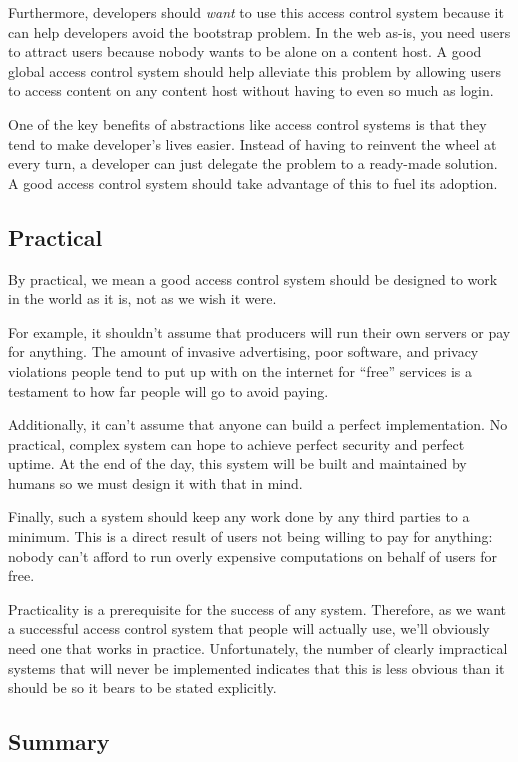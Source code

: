 \documentclass[pdftex,12pt,a4papaer,twoside,notitlepage]{report}
\begin{document}
Furthermore, developers should \emph{want} to use this access control system
because it can help developers avoid the bootstrap problem. In the web as-is,
you need users to attract users because nobody wants to be alone on a content
host. A good global access control system should help alleviate this problem by
allowing users to access content on any content host without having to even so
much as login.

One of the key benefits of abstractions like access control systems is that they
tend to make developer's lives easier. Instead of having to reinvent the wheel
at every turn, a developer can just delegate the problem to a ready-made
solution. A good access control system should take advantage of this to fuel its
adoption.

\subsection{Practical}

By practical, we mean a good access control system should be designed to work in
the world as it is, not as we wish it were.

For example, it shouldn't assume that producers will run their own servers or
pay for anything. The amount of invasive advertising, poor software, and privacy
violations people tend to put up with on the internet for ``free'' services is a
testament to how far people will go to avoid paying.

Additionally, it can't assume that anyone can build a perfect implementation. No
practical, complex system can hope to achieve perfect security and perfect
uptime. At the end of the day, this system will be built and maintained by
humans so we must design it with that in mind.

Finally, such a system should keep any work done by any third parties to a
minimum. This is a direct result of users not being willing to pay for anything:
nobody can't afford to run overly expensive computations on behalf of users for
free.

Practicality is a prerequisite for the success of any system. Therefore, as we
want a successful access control system that people will actually use, we'll
obviously need one that works in practice. Unfortunately, the number of clearly
impractical systems that will never be implemented indicates that this is less
obvious than it should be so it bears to be stated explicitly.

\subsection{Summary}
\end{document}
